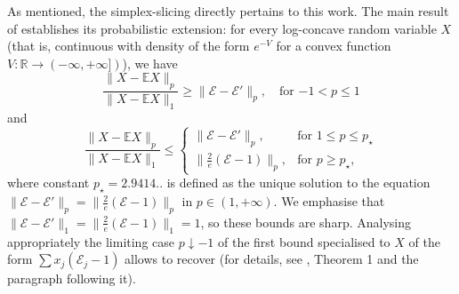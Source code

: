 \documentclass[10pt]{article}
\newcommand{\E}{\mathbb{E}}
\newcommand{\1}{\textbf{1}}
\newcommand{\R}{\mathbb{R}}
\newcommand{\cE}{\mathscr{E}}
\theoremstyle{remark}
\theoremstyle{definition}
\begin{document}
As mentioned, the simplex-slicing directly pertains to this work. The main result of \cite{MRTT} establishes its probabilistic extension: for every log-concave random variable $X$ (that is, continuous with density of the form $e^{-V}$ for a convex function $V\colon \R \to (-\infty, +\infty])$), we have
\begin{equation}\label{eq:MRTT1}
\frac{\|X - \E X\|_p}{\|X - \E X\|_1}  \geq \|\cE - \cE'\|_p, \quad \text{for $-1 < p \leq 1$}
 \end{equation}
and
\begin{equation}\label{eq:MRTT2}
\frac{\|X - \E X\|_p}{\|X - \E X\|_1}  \leq \begin{cases} \|\cE - \cE'\|_p, & \text{for $1 \leq p \leq p_\star$} \\ \|\frac{2}{e}(\cE - 1)\|_p, & \text{for $p \geq p_\star$}, \end{cases}
 \end{equation}
where constant $p_\star = 2.9414..$ is defined as the unique solution to the equation $\|\cE - \cE'\|_p= \|\frac{2}{e}(\cE - 1)\|_p$ in $p \in (1, +\infty)$. We emphasise that $\|\cE - \cE'\|_1 = \|\frac{2}{e}(\cE - 1)\|_1 = 1$, so these bounds are sharp. Analysing appropriately the limiting case $p \downarrow -1$ of the first bound specialised to $X$ of the form $\sum x_j(\cE_j-1)$ allows to recover \cite{Webb} (for details, see \cite{MRTT}, Theorem 1 and the paragraph following it).
\end{document}
